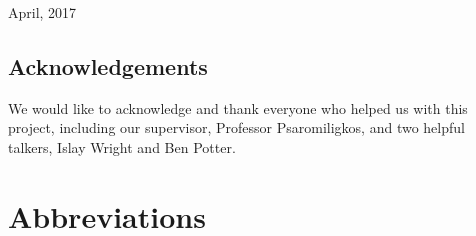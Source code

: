 \documentclass[11pt]{article}
\begin{document}
\begin{titlepage}
	
	
	\vfill\vfill\vfill %
	
	{\large April, 2017} 
	
	\vfill %
\end{titlepage}
\begin{abstract}

\end{abstract}
\pagebreak

\begin{center}
\section*{Acknowledgements}
\end{center}
We would like to acknowledge and thank everyone who helped us with this project, including our supervisor, Professor Psaromiligkos, and two helpful talkers, Islay Wright and Ben Potter.
\pagebreak
\tableofcontents
\pagebreak
\cleardoublepage
{}
\listoffigures
\pagebreak
\section*{Abbreviations}


\pagebreak
\end{document}
